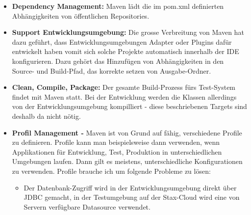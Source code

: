 \begin{itemize}
\item \textbf{Dependency Management: } Maven l\"adt die im pom.xml definierten Abh\"angigkeiten von \"offentlichen Repositories. 
\item \textbf{Support Entwicklungsumgebung:  } Die grosse Verbreitung von Maven hat dazu gef\"uhrt, dass Entwicklungsumgebungen Adapter oder Plugins daf\"ur entwickelt haben vomit sich solche Projekte automatisch innerhalb der IDE konfigurieren. Dazu geh\"ort das Hinzuf\"ugen von Abh\"angigkeiten in den Source- und Build-Pfad, das korrekte setzen von Ausgabe-Ordner. 
\item \textbf{Clean, Compile, Package: }Der gesamte Build-Prozess f\"urs Test-System findet mit Maven statt. Bei der Entwicklung werden die Klassen allerdings von der Entwicklungsumgebung kompilliert - diese beschriebenen Targets sind deshalb da nicht n\"otig. 
\item \textbf{Profil Management - } Maven ist von Grund auf f\"ahig, verschiedene Profile zu definieren. Profile kann man beispielsweise dann verwenden, wenn Applikationen f\"ur Entwicklung, Test, Produktion in unterschiedlichen Umgebungen laufen. Dann gilt es meistens, unterschiedliche Konfigurationen zu verwenden. Profile brauche ich um folgende Probleme zu l\"osen:\begin{itemize}
\item Der Datenbank-Zugriff wird in der Entwicklungsumgebung direkt \"uber JDBC gemacht, in der Testumgebung auf der Stax-Cloud wird eine von Servern verf\"ugbare Datasource verwendet.
\end{itemize}
\end{itemize}
